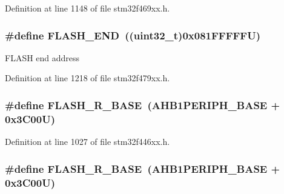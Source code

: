 Definition at line 1148 of file stm32f469xx.\+h.

\subsubsection[{\texorpdfstring{F\+L\+A\+S\+H\+\_\+\+E\+ND}{FLASH_END}}]{\setlength{\rightskip}{0pt plus 5cm}\#define F\+L\+A\+S\+H\+\_\+\+E\+ND~((uint32\+\_\+t)0x081\+F\+F\+F\+F\+F\+U)}\hypertarget{group___peripheral__memory__map_ga8be554f354e5aa65370f6db63d4f3ee4}{}\label{group___peripheral__memory__map_ga8be554f354e5aa65370f6db63d4f3ee4}
F\+L\+A\+SH end address 

Definition at line 1218 of file stm32f479xx.\+h.

\subsubsection[{\texorpdfstring{F\+L\+A\+S\+H\+\_\+\+R\+\_\+\+B\+A\+SE}{FLASH_R_BASE}}]{\setlength{\rightskip}{0pt plus 5cm}\#define F\+L\+A\+S\+H\+\_\+\+R\+\_\+\+B\+A\+SE~({\bf A\+H\+B1\+P\+E\+R\+I\+P\+H\+\_\+\+B\+A\+SE} + 0x3\+C00\+U)}\hypertarget{group___peripheral__memory__map_ga8e21f4845015730c5731763169ec0e9b}{}\label{group___peripheral__memory__map_ga8e21f4845015730c5731763169ec0e9b}


Definition at line 1027 of file stm32f446xx.\+h.

\subsubsection[{\texorpdfstring{F\+L\+A\+S\+H\+\_\+\+R\+\_\+\+B\+A\+SE}{FLASH_R_BASE}}]{\setlength{\rightskip}{0pt plus 5cm}\#define F\+L\+A\+S\+H\+\_\+\+R\+\_\+\+B\+A\+SE~({\bf A\+H\+B1\+P\+E\+R\+I\+P\+H\+\_\+\+B\+A\+SE} + 0x3\+C00\+U)}\hypertarget{group___peripheral__memory__map_ga8e21f4845015730c5731763169ec0e9b}{}\label{group___peripheral__memory__map_ga8e21f4845015730c5731763169ec0e9b}



